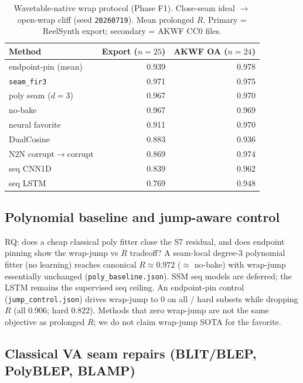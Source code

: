 \begin{table}[t]
  \centering
  \caption{Wavetable-native wrap protocol (Phase F1). Close-seam ideal $\to$ open-wrap cliff (seed \texttt{20260719}). Mean prolonged $R$. Primary = ReelSynth export; secondary = AKWF CC0 files.}
  \label{tab:real-wt}
  \setlength{\tabcolsep}{3pt}
  \begin{tabular}{@{}lrr@{}}
    \toprule
    Method & Export ($n{=}25$) & AKWF OA ($n{=}24$) \\
    \midrule
    endpoint-pin (mean) & 0.939 & 0.978 \\
    \texttt{seam\_fir3} & 0.971 & 0.975 \\
    poly seam ($d{=}3$) & 0.967 & 0.970 \\
    no-bake & 0.967 & 0.969 \\
    neural favorite & 0.911 & 0.970 \\
    DualCosine & 0.883 & 0.936 \\
    N2N corrupt$\to$corrupt & 0.869 & 0.974 \\
    seq CNN1D & 0.839 & 0.962 \\
    seq LSTM & 0.769 & 0.948 \\
    \bottomrule
  \end{tabular}
\end{table}

\subsection{Polynomial baseline and jump-aware control}
\label{sec:poly-jump}

RQ: does a cheap classical poly fitter close the S7 residual, and does endpoint pinning show the wrap-jump vs $R$ tradeoff?
A seam-local degree-3 polynomial fitter (no learning) reaches canonical $R\approx 0.972$ ($\approx$ no-bake) with wrap-jump essentially unchanged (\texttt{poly\_baseline.json}).
SSM seq models are deferred; the LSTM remains the supervised seq ceiling.
An endpoint-pin control (\texttt{jump\_control.json}) drives wrap-jump to $0$ on all / hard subsets while dropping $R$ (all $0.906$; hard $0.822$).
Methods that zero wrap-jump are not the same objective as prolonged $R$; we do not claim wrap-jump SOTA for the favorite.

\subsection{Classical VA seam repairs (BLIT/BLEP, PolyBLEP, BLAMP)}
\label{sec:va-seam-baselines}


